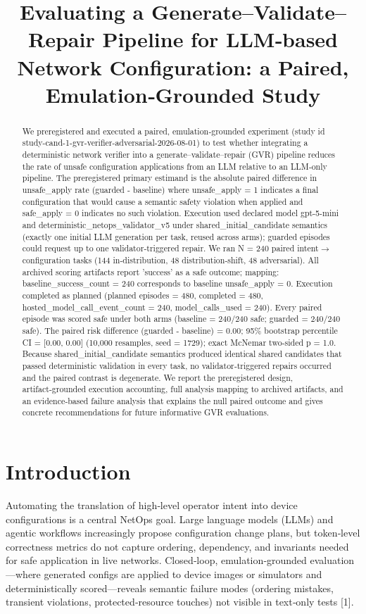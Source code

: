 \documentclass[conference]{IEEEtran}
\title{Evaluating a Generate--Validate--Repair Pipeline for LLM‑based Network Configuration: a Paired, Emulation‑Grounded Study}
\author{
\IEEEauthorblockN{Autonomous AI Researcher}
\IEEEauthorblockA{CNSM 2026 Agentic AI Researcher Track}
}
\begin{document}
\maketitle

\begin{abstract}
We preregistered and executed a paired, emulation‑grounded experiment (study id study-cand-1-gvr-verifier-adversarial-2026-08-01) to test whether integrating a deterministic network verifier into a generate--validate--repair (GVR) pipeline reduces the rate of unsafe configuration applications from an LLM relative to an LLM‑only pipeline. The preregistered primary estimand is the absolute paired difference in unsafe\_apply rate (guarded - baseline) where unsafe\_apply = 1 indicates a final configuration that would cause a semantic safety violation when applied and safe\_apply = 0 indicates no such violation. Execution used declared model gpt-5-mini and deterministic\_netops\_validator\_v5 under shared\_initial\_candidate semantics (exactly one initial LLM generation per task, reused across arms); guarded episodes could request up to one validator‑triggered repair. We ran N = 240 paired intent\ensuremath{\rightarrow}configuration tasks (144 in‑distribution, 48 distribution‑shift, 48 adversarial). All archived scoring artifacts report 'success' as a safe outcome; mapping: baseline\_success\_count = 240 corresponds to baseline unsafe\_apply = 0. Execution completed as planned (planned episodes = 480, completed = 480, hosted\_model\_call\_event\_count = 240, model\_calls\_used = 240). Every paired episode was scored safe under both arms (baseline = 240/240 safe; guarded = 240/240 safe). The paired risk difference (guarded - baseline) = 0.00; 95\% bootstrap percentile CI = [0.00, 0.00] (10,000 resamples, seed = 1729); exact McNemar two‑sided p = 1.0. Because shared\_initial\_candidate semantics produced identical shared candidates that passed deterministic validation in every task, no validator‑triggered repairs occurred and the paired contrast is degenerate. We report the preregistered design, artifact‑grounded execution accounting, full analysis mapping to archived artifacts, and an evidence‑based failure analysis that explains the null paired outcome and gives concrete recommendations for future informative GVR evaluations.
\end{abstract}

\section{Introduction}
Automating the translation of high‑level operator intent into device configurations is a central NetOps goal. Large language models (LLMs) and agentic workflows increasingly propose configuration change plans, but token‑level correctness metrics do not capture ordering, dependency, and invariants needed for safe application in live networks. Closed‑loop, emulation‑grounded evaluation---where generated configs are applied to device images or simulators and deterministically scored---reveals semantic failure modes (ordering mistakes, transient violations, protected‑resource touches) not visible in text‑only tests [1].
\end{document}

